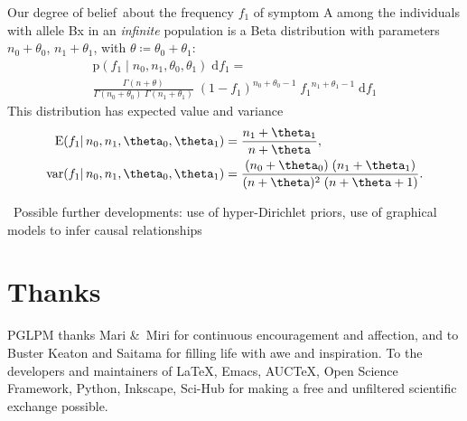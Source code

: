 \documentclass[\ifafour a4paper,12pt,\else a5paper,10pt,\fi%
onecolumn,oneside,article,%
british%
]{memoir}
\theoremstyle{remark}
\theoremstyle{innote}
\newcommand*{\citep}{\parencites}
\newcommand*{\amp}{\&}
\newenvironment{acknowledgements}{\section*{Thanks}\addcontentsline{toc}{section}{Thanks}}{\par}
\newcommand*{\di}{\mathrm{d}}%
\newcommand*{\defd}{\coloneqq}
\newcommand*{\pf}{\mathrm{p}}%
\renewcommand*{\|}{\mathpunct{|}}
\newcommand*{\E}{\mathrm{E}}
\DeclarePairedDelimiter\expp{(}{)}
\newcommand*{\expe}{\E\expp}%
\newcommand*{\puzzle}{\maltese}
\newcommand{\mynote}[1]{ {\color{notecolour}\puzzle\ #1}}
\DeclareMathOperator{\var}{var}
\newcommand*{\dob}{degree of belief}
\begin{document}
Our \dob\ about the frequency $f_1$ of symptom A among the individuals with
allele Bx in an \emph{infinite} population is a Beta distribution with
parameters $n_0+\theta_0$, $n_1+\theta_1$, with
$\theta \defd \theta_0+\theta_1$:
\begin{multline}
  \label{eq:beta_fr}
  \pf(f_1 \| n_0,n_1,\theta_0,\theta_1)\;\di f_1 ={}\\
  \frac{\Gamma(n+\theta)}{\Gamma(n_0+\theta_0)\;\Gamma(n_1+\theta_1)}
  \; (1-f_1)^{n_0+\theta_0-1}\;{f_1}^{n_1+\theta_1-1} \;\di f_1
\end{multline}
This distribution has expected value and variance
\begin{equation}
  \label{eq:exp_value}
  \begin{split}
  \expe{f_1 \| n_0, n_1, \theta_0,\theta_1} &= \frac{n_1+\theta_1}{n+\theta},
  \\
  \var(f_1 \|  n_0, n_1, \theta_0,\theta_1) &=
  \frac{(n_0+\theta_0)\;(n_1+\theta_1)}{(n+\theta)^2\;(n+\theta+1)}.
\end{split}
\end{equation}



\mynote{Possible further developments: use of hyper-Dirichlet priors, use
  of graphical models to infer causal relationships
  \citep{pearl2000_r2009}}



%



\begin{acknowledgements}
  PGLPM thanks Mari \amp\ Miri for continuous encouragement and affection, and
  to Buster Keaton and Saitama for filling life with awe and inspiration.
  To the developers and maintainers of \LaTeX, Emacs, AUC\TeX, Open Science
  Framework, Python, Inkscape, Sci-Hub for making a free and unfiltered
  scientific exchange possible.
\end{acknowledgements}





\printbibliography[prenote=prenote%
]
\end{document}
